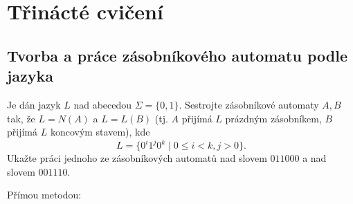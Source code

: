 \setlength{\abovedisplayskip}{0pt}
\setlength{\belowdisplayskip}{0pt}
\setlength{\abovedisplayshortskip}{0pt}
\setlength{\belowdisplayshortskip}{0pt}

\section{Třinácté cvičení}

\subsection{Tvorba a práce zásobníkového automatu podle jazyka}
Je dán jazyk $L$ nad abecedou $\Sigma = \{0,1\}$. Sestrojte zásobníkové automaty $A,B$ tak, že $L = N(A)$ a $L = L(B)$
(tj. $A$ přijímá $L$ prázdným zásobníkem, $B$ přijímá $L$ koncovým stavem), kde
\[L = \{0^i 1^j 0^k \mid 0 \leq i < k, j > 0\}\text{.}\]
Ukažte práci jednoho ze zásobníkových automatů nad slovem $011000$ a nad slovem $001110$.

Přímou metodou:

